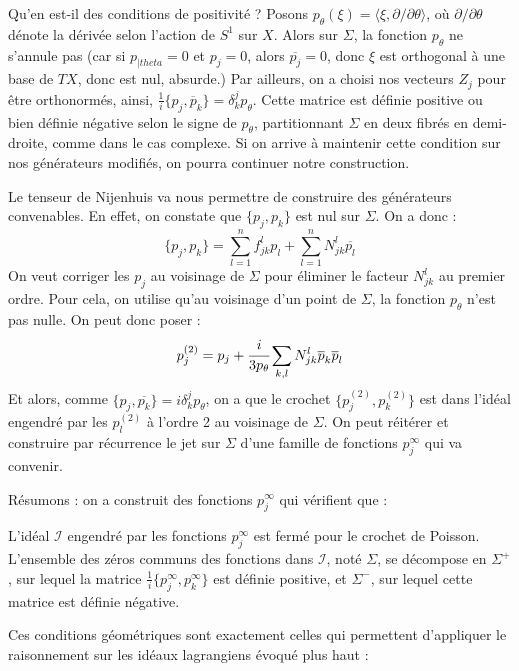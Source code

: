 Qu'en est-il des conditions de positivité ? Posons $p_{\theta}(\xi) = \langle \xi, \partial/\partial \theta \rangle$, où $\partial/\partial \theta$ dénote la dérivée selon l'action de $S^1$ sur $X$. Alors sur $\Sigma$, la fonction $p_{\theta}$ ne s'annule pas (car si $p_{|theta}=0$ et $p_j=0$, alors $\overline{p_j}=0$, donc $\xi$ est orthogonal à une base de $TX$, donc est nul, absurde.) Par ailleurs, on a choisi nos vecteurs $Z_j$ pour être orthonormés, ainsi, $\frac 1i \{p_j,\overline{p}_k\}=\delta^j_kp_{\theta}$. Cette matrice est définie positive ou bien définie négative selon le signe de $p_\theta$, partitionnant $\Sigma$ en deux fibrés en demi-droite, comme dans le cas complexe. Si on arrive à maintenir cette condition sur nos générateurs modifiés, on pourra continuer notre construction.

Le tenseur de Nijenhuis va nous permettre de construire des générateurs convenables. En effet, on constate que $\{p_j,p_k\}$ est nul sur $\Sigma$. On a donc :
\begin{equation*}
	\{p_j,p_k\} = \sum_{l=1}^nf^l_{jk}p_l + \sum_{l=1}^{n}N^l_{jk}\overline{p_l}
\end{equation*}
On veut corriger les $p_j$ au voisinage de $\Sigma$ pour éliminer le facteur $N^l_{jk}$ au premier ordre. Pour cela, on utilise qu'au voisinage d'un point de $\Sigma$, la fonction $p_{\theta}$ n'est pas nulle. On peut donc poser :
\begin{equation*}
	p_j^{(2)} = p_j + \cfrac{i}{3p_{\theta}}\sum_{k,l}N^l_{jk}\overline{p}_k\overline{p}_l
\end{equation*}
Et alors, comme $\{p_j,\overline{p_k}\}=i\delta^j_k p_{\theta}$, on a que le crochet $\{p_j^{(2)},p_k^{(2)} \}$ est dans l'idéal engendré par les $p_l^{(2)}$ à l'ordre 2 au voisinage de $\Sigma$. On peut réitérer et construire par récurrence le jet sur $\Sigma$ d'une famille de fonctions $p^{\infty}_j$ qui va convenir.

Résumons : on a construit des fonctions $p^{\infty}_j$ qui vérifient que :
\begin{prop}
	L'idéal $\mathcal{I}$ engendré par les fonctions $p^{\infty}_j$ est fermé pour le crochet de Poisson. L'ensemble des zéros communs des fonctions dans $\mathcal{I}$, noté $\Sigma$, se décompose en $\Sigma^+$, sur lequel la matrice $\frac 1i \{p^{\infty}_j,p^{\infty}_k\}$ est définie positive, et $\Sigma^-$, sur lequel cette matrice est définie négative.
\end{prop}

Ces conditions géométriques sont exactement celles qui permettent d'appliquer le raisonnement sur les idéaux lagrangiens évoqué plus haut :

